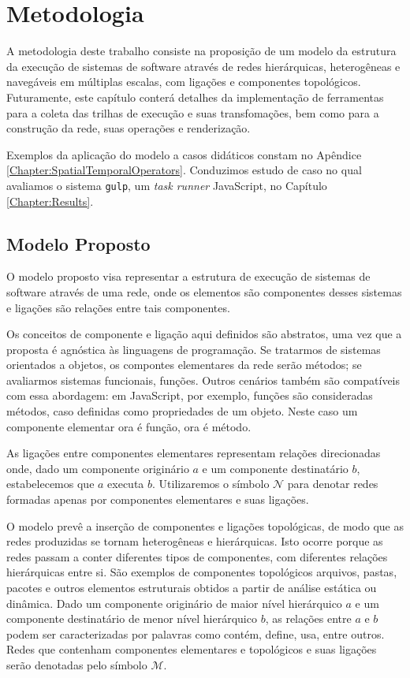 
%

\chapter{Metodologia}
\label{Chapter:Methodology}

A metodologia deste trabalho consiste na proposição de um modelo da estrutura da
execução de sistemas de software através de redes hierárquicas, heterogêneas e
navegáveis em múltiplas escalas, com ligações e componentes topológicos.
Futuramente, este capítulo conterá detalhes da implementação de ferramentas para
a coleta das trilhas de execução e suas transfomações, bem como para a
construção da rede, suas operações e renderização.

Exemplos da aplicação do modelo a casos didáticos constam no Apêndice
\ref{Chapter:SpatialTemporalOperators}. Conduzimos estudo de caso no qual
avaliamos o sistema \texttt{gulp}, um \textit{task runner} JavaScript, no
Capítulo \ref{Chapter:Results}.

\section{Modelo Proposto}
\label{sec:PropusedModel}

O modelo proposto visa representar a estrutura de execução de sistemas de
software através de uma rede, onde os elementos são componentes desses sistemas
e ligações são relações entre tais componentes.

Os conceitos de componente e ligação aqui definidos são abstratos, uma vez que a
proposta é agnóstica às linguagens de programação.
Se tratarmos de sistemas orientados a objetos, os compontes elementares da rede
serão métodos; se avaliarmos sistemas funcionais, funções.
Outros cenários também são compatíveis com essa abordagem: em JavaScript, por
exemplo, funções são consideradas métodos, caso definidas como propriedades de
um objeto. Neste caso um componente elementar ora é função, ora é método. 

As ligações entre componentes elementares representam relações direcionadas
onde, dado um componente originário $a$ e um componente destinatário $b$,
estabelecemos que $a$ executa $b$.
Utilizaremos o símbolo $\mathcal{N}$ para denotar redes formadas apenas por
componentes elementares e suas ligações.

O modelo prevê a inserção de componentes e ligações topológicas, de modo que as
redes produzidas se tornam heterogêneas e hierárquicas.
Isto ocorre porque as redes passam a conter diferentes tipos de componentes, com
diferentes relações hierárquicas entre si.
São exemplos de componentes topológicos arquivos, pastas, pacotes e outros
elementos estruturais obtidos a partir de análise estática ou dinâmica.
Dado um componente originário de maior nível hierárquico $a$ e um componente
destinatário de menor nível hierárquico $b$, as relações entre $a$ e $b$ podem
ser caracterizadas por palavras como contém, define, usa, entre outros.
Redes que contenham componentes elementares e topológicos e suas ligações serão
denotadas pelo símbolo $\mathcal{M}$.

